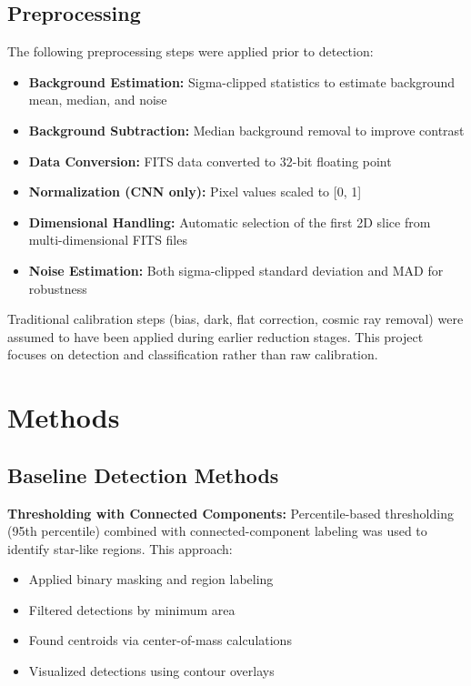 \documentclass[12pt]{article}
\begin{document}
\subsection{Preprocessing}
The following preprocessing steps were applied prior to detection:
\begin{itemize}
    \item \textbf{Background Estimation:} Sigma-clipped statistics to estimate background mean, median, and noise
    \item \textbf{Background Subtraction:} Median background removal to improve contrast
    \item \textbf{Data Conversion:} FITS data converted to 32-bit floating point
    \item \textbf{Normalization (CNN only):} Pixel values scaled to [0, 1]
    \item \textbf{Dimensional Handling:} Automatic selection of the first 2D slice from multi-dimensional FITS files
    \item \textbf{Noise Estimation:} Both sigma-clipped standard deviation and MAD for robustness
\end{itemize}

Traditional calibration steps (bias, dark, flat correction, cosmic ray removal) were assumed to have been applied during earlier reduction stages. This project focuses on detection and classification rather than raw calibration.

\section{Methods}

\subsection{Baseline Detection Methods}

\textbf{Thresholding with Connected Components:}
Percentile-based thresholding (95th percentile) combined with connected-component labeling was used to identify star-like regions. This approach:
\begin{itemize}
    \item Applied binary masking and region labeling
    \item Filtered detections by minimum area
    \item Found centroids via center-of-mass calculations
    \item Visualized detections using contour overlays
\end{itemize}
\end{document}
